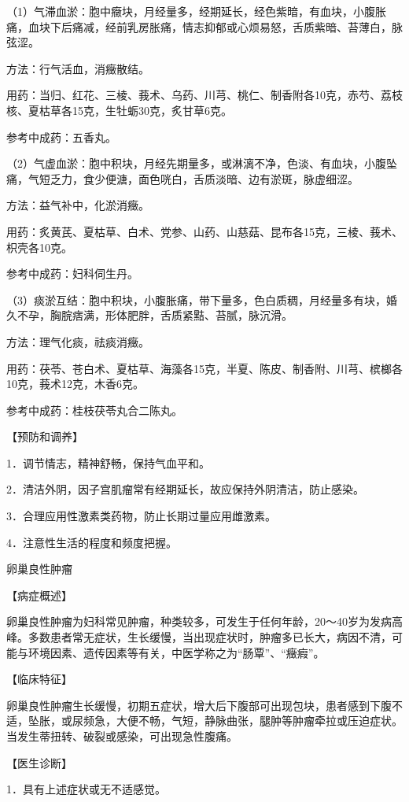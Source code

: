 \documentclass[12pt,UTF8,openany]{ctexbook}
\begin{document}
（1）气滞血淤：胞中癥块，月经量多，经期延长，经色紫暗，有血块，小腹胀痛，血块下后痛减，经前乳房胀痛，情志抑郁或心烦易怒，舌质紫暗、苔薄白，脉弦涩。

方法：行气活血，消癥散结。

用药：当归、红花、三棱、莪术、乌药、川芎、桃仁、制香附各10克，赤芍、荔枝核、夏枯草各15克，生牡蛎30克，炙甘草6克。

参考中成药：五香丸。

（2）气虚血淤：胞中积块，月经先期量多，或淋漓不净，色淡、有血块，小腹坠痛，气短乏力，食少便溏，面色咣白，舌质淡暗、边有淤斑，脉虚细涩。

方法：益气补中，化淤消癥。

用药：炙黄芪、夏枯草、白术、党参、山药、山慈菇、昆布各15克，三棱、莪术、枳壳各10克。

参考中成药：妇科伺生丹。

（3）痰淤互结：胞中积块，小腹胀痛，带下量多，色白质稠，月经量多有块，婚久不孕，胸脘痞满，形体肥胖，舌质紧黠、苔腻，脉沉滑。

方法：理气化痰，祛痰消癥。

用药：茯苓、苍白术、夏枯草、海藻各15克，半夏、陈皮、制香附、川芎、槟榔各10克，莪术12克，木香6克。

参考中成药：桂枝茯苓丸合二陈丸。

【预防和调养】

1．调节情志，精神舒畅，保持气血平和。

2．清洁外阴，因子宫肌瘤常有经期延长，故应保持外阴清洁，防止感染。

3．合理应用性激素类药物，防止长期过量应用雌激素。

4．注意性生活的程度和频度把握。





卵巢良性肿瘤


【病症概述】

卵巢良性肿瘤为妇科常见肿瘤，种类较多，可发生于任何年龄，20～40岁为发病高峰。多数患者常无症状，生长缓慢，当出现症状时，肿瘤多已长大，病因不清，可能与环境因素、遗传因素等有关，中医学称之为“肠覃”、“癥瘕”。

【临床特征】

卵巢良性肿瘤生长缓慢，初期五症状，增大后下腹部可出现包块，患者感到下腹不适，坠胀，或尿频急，大便不畅，气短，静脉曲张，腿肿等肿瘤牵拉或压迫症状。当发生蒂扭转、破裂或感染，可出现急性腹痛。

【医生诊断】

1．具有上述症状或无不适感觉。
\end{document}
